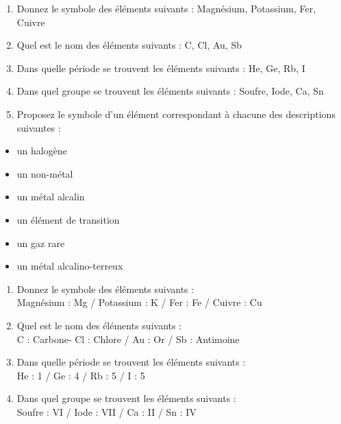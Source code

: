 \documentclass[
  11pt,
  a4paper,
  openany]{book}
\providecommand{\tightlist}{%
  \setlength{\itemsep}{0pt}\setlength{\parskip}{0pt}}
\begin{document}
\begin{Exercise}

\begin{enumerate}
\def\labelenumi{\arabic{enumi}.}
\tightlist
\item
  Donnez le symbole des éléments suivants :
  Magnésium, Potassium, Fer, Cuivre\\
\item
  Quel est le nom des éléments suivants :
  C, Cl, Au, Sb\\
\item
  Dans quelle période se trouvent les éléments suivants :
  He, Ge, Rb, I\\
\item
  Dans quel groupe se trouvent les éléments suivants :
  Soufre, Iode, Ca, Sn\\
\item
  Proposez le symbole d'un élément correspondant à chacune des descriptions suivantes :
\end{enumerate}

\begin{itemize}
\tightlist
\item
  un halogène
\item
  un non-métal
\item
  un métal alcalin
\item
  un élément de transition
\item
  un gaz rare
\item
  un métal alcalino-terreux
\end{itemize}

\end{Exercise}

\begin{Answer}

\begin{enumerate}
\def\labelenumi{\arabic{enumi}.}
\tightlist
\item
  Donnez le symbole des éléments suivants :\\
  Magnésium : Mg / Potassium : K / Fer : Fe / Cuivre : Cu
\item
  Quel est le nom des éléments suivants :\\
  C : Carbone- Cl : Chlore / Au : Or / Sb : Antimoine
\item
  Dans quelle période se trouvent les éléments suivants :\\
  He : 1 / Ge : 4 / Rb : 5 / I : 5
\item
  Dans quel groupe se trouvent les éléments suivants :\\
  Soufre : VI / Iode : VII / Ca : II / Sn : IV
\end{enumerate}

\end{Answer}
\end{document}
